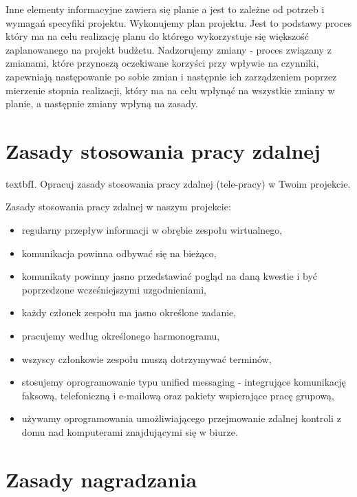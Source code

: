 Inne elementy informacyjne zawiera się planie a jest to zależne od potrzeb i wymagań specyfiki projektu.
Wykonujemy plan projektu. Jest to podstawy proces który ma na celu realizację planu do którego wykorzystuje się większość zaplanowanego na projekt budżetu.
Nadzorujemy zmiany - proces związany z zmianami, które przynoszą oczekiwane korzyści przy wpływie na czynniki, zapewniają następowanie po sobie zmian i następnie ich zarządzeniem poprzez mierzenie stopnia realizacji, który ma na celu wpłynąć na wszystkie zmiany w planie, 
a następnie zmiany wpłyną na zasady.




\section{Zasady stosowania pracy zdalnej}

textbf{I. Opracuj zasady stosowania pracy zdalnej (tele-pracy) w Twoim projekcie.}

Zasady stosowania pracy zdalnej w naszym projekcie:
\begin{itemize}
\item regularny przepływ informacji w obrębie zespołu wirtualnego,
\item komunikacja powinna odbywać się na bieżąco,
\item komunikaty powinny jasno przedstawiać pogląd na daną kwestie i  być poprzedzone wcześniejszymi uzgodnieniami,
\item każdy członek zespołu ma jasno określone zadanie,
\item pracujemy według określonego harmonogramu,
\item wszyscy członkowie zespołu muszą dotrzymywać terminów,
\item stosujemy oprogramowanie typu unified messaging - integrujące komunikację faksową, telefoniczną i e-mailową oraz pakiety wspierające pracę grupową,
\item używamy oprogramowania umożliwiającego przejmowanie zdalnej kontroli z domu nad komputerami znajdującymi się w biurze.

\end{itemize}



\section{Zasady nagradzania}

